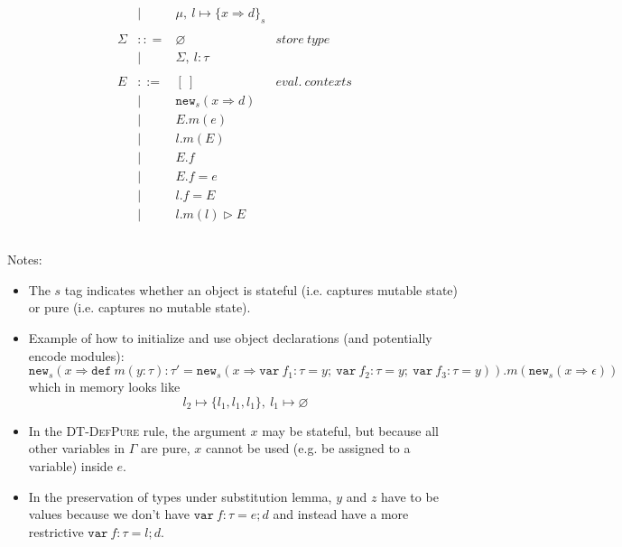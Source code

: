 \documentclass{llncs}
\newcommand{\keywadj}[1]{\mathtt{#1}}
\newcommand{\keyw}[1]{\keywadj{#1}~}
\begin{document}
\[\begin{array}{lll}
\begin{array}{lllr}
& | & \mu,~l \mapsto \{ x \Rightarrow d \}_{s}\\
&&\\
\Sigma & :: = & \varnothing & store~type\\
& | & \Sigma,~l : \tau\\
&&\\
E & ::= & [~] & eval.~ contexts\\
  & |   & \keywadj{new}_{s}(x \Rightarrow d) \\
  & |   & E.m(e)\\
  & |   & l.m(E)\\
  & |   & E.f \\
  & |   & E.f = e \\
  & |   & l.f = E \\
  & |   & l.m(l) \rhd E \\
&&\\
\end{array}
\end{array}
\]

\noindent Notes:

\begin{itemize}
\item The $s$ tag indicates whether an object is stateful (i.e. captures mutable state) or pure (i.e. captures no mutable state).
\item Example of how to initialize and use object declarations (and potentially encode modules):
\[
\keywadj{new}_{s}(x \Rightarrow \keyw{def} m(y : \tau) : \tau' = \keywadj{new}_{s}(x \Rightarrow \keyw{var} f_1 : \tau = y;~\keyw{var} f_2 : \tau = y;~\keyw{var} f_3 : \tau = y)).m(\keywadj{new}_{s} (x \Rightarrow \epsilon))
\]
which in memory looks like 
\[
l_2 \mapsto \{l_1,l_1,l_1\},~l_1 \mapsto \varnothing
\]
\item In the \textsc{DT-DefPure} rule, the argument $x$ may be stateful, but because all other variables in $\Gamma$ are pure, $x$ cannot be used (e.g. be assigned to a variable) inside $e$.
\item In the preservation of types under substitution lemma, $y$ and $z$ have to be values because we don't have $\keyw{var} f:\tau = e; d$ and instead have a more restrictive $\keyw{var} f:\tau = l;d$.
\end{itemize}
\end{document}
